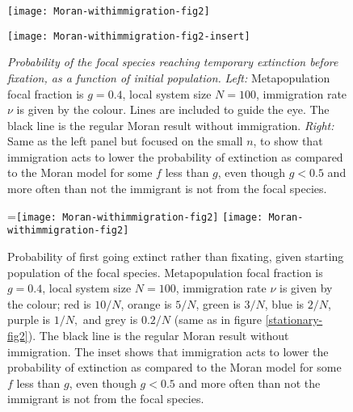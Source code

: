 \begin{figure}[h]
	\centering
	\begin{minipage}{0.49\linewidth}
		\centering
		\texttt{[image: Moran-withimmigration-fig2]}
	\end{minipage}
	\begin{minipage}{0.49\linewidth}
		\centering
		\texttt{[image: Moran-withimmigration-fig2-insert]}
	\end{minipage}
	\caption{\emph{Probability of the focal species reaching temporary extinction before fixation, as a function of initial population.}
		\emph{Left:} Metapopulation focal fraction is $g=0.4$, local system size $N=100$, immigration rate $\nu$ is given by the colour. Lines are included to guide the eye. The black line is the regular Moran result without immigration. %
		\emph{Right:} Same as the left panel but focused on the small $n$, to show that immigration acts to lower the probability of extinction as compared to the Moran model for some $f$ less than $g$, even though $g<0.5$ and more often than not the immigrant is not from the focal species. 
	} \label{extnprobfig-ihope}
\end{figure}
\iffalse
\begin{figure}[ht]
	\centering
	=\hbox{\texttt{[image: Moran-withimmigration-fig2]}}
	\texttt{[image: Moran-withimmigration-fig2]}
	\caption{Probability of first going extinct rather than fixating, given starting population of the focal species. Metapopulation focal fraction is $g=0.4$, local system size $N=100$, immigration rate $\nu$ is given by the colour; red is $10/N$, orange is $5/N$, green is $3/N$, blue is $2/N$, purple is $1/N,$ and grey is $0.2/N$ (same as in figure \ref{stationary-fig2}). The black line is the regular Moran result without immigration. The inset shows that immigration acts to lower the probability of extinction as compared to the Moran model for some $f$ less than $g$, even though $g<0.5$ and more often than not the immigrant is not from the focal species. } \label{extnprobfig-ihope}
\end{figure}
